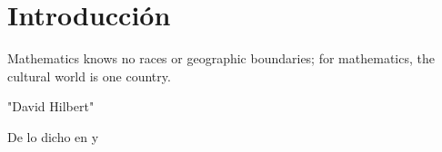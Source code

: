 \chapter{Introducci\'on}\label{ch:introduccion}

\epigraph{Mathematics knows no races
	or geographic boundaries;
	for mathematics,
	the cultural world
	is one country.}{"David Hilbert"}

De lo dicho en \cite{krizhevsky:2012} y \cite{lee:2016}

\smallskip
